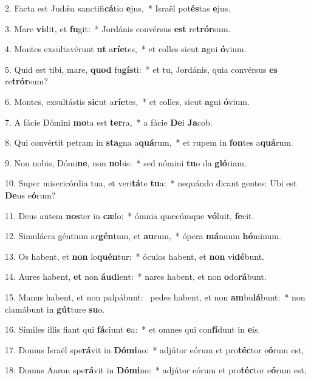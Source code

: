 2. Facta est Judǽa sanctifi\textbf{cá}tio \textbf{e}jus,~*  Israël pot\textbf{és}tas \textbf{e}jus.\

3. Mare \textbf{vi}dit, et \textbf{fu}git:~*  Jordánis convérsus \textbf{est} re\textbf{trór}sum.\

4. Montes exsultavérunt \textbf{ut} a\textbf{rí}\textbf{e}tes,~*  et colles sicut \textbf{a}gni \textbf{ó}vium.\

5. Quid est tibi, mare, \textbf{quod} fu\textbf{gís}ti:~*  et tu, Jordánis, quia convérsus \textbf{es} re\textbf{trór}sum?\

6. Montes, exsultástis \textbf{sic}ut a\textbf{rí}\textbf{e}tes,~*  et colles, sicut \textbf{a}gni \textbf{ó}vium.\

7. A fácie Dómini \textbf{mo}ta est \textbf{ter}ra,~*  a fácie \textbf{De}i \textbf{Ja}cob.\

8. Qui convértit petram in \textbf{sta}gna a\textbf{quá}rum,~*  et rupem in \textbf{fon}tes a\textbf{quá}rum.\

9. Non nobis, Dómi\textbf{ne}, non \textbf{no}bis:~*  sed nómini \textbf{tu}o da \textbf{gló}riam.\

10. Super misericórdia tua, et veri\textbf{tá}te \textbf{tu}a:~*  nequándo dicant gentes: Ubi est \textbf{De}us e\textbf{ó}rum?\

11. Deus autem \textbf{nos}ter in \textbf{cæ}lo:~*  ómnia quæcúmque \textbf{vó}luit, \textbf{fe}cit.\

12. Simulácra géntium ar\textbf{gén}tum, et \textbf{au}rum,~*  ópera \textbf{má}nuum \textbf{hó}minum.\

13. Os habent, et \textbf{non} lo\textbf{quén}tur:~*  óculos habent, et \textbf{non} vi\textbf{dé}bunt.\

14. Aures habent, \textbf{et} non \textbf{áu}\textbf{di}ent:~*  nares habent, et non \textbf{o}do\textbf{rá}bunt.\

15. Manus habent, et non palpábunt: \dag\  pedes habent, et non \textbf{am}bu\textbf{lá}bunt:~*  non clamábunt in \textbf{gút}ture \textbf{su}o.\

16. Símiles illis fiant qui \textbf{fá}ciunt \textbf{e}a:~*  et omnes qui con\textbf{fí}dunt in \textbf{e}is.\

17. Domus Israël spe\textbf{rá}vit in \textbf{Dó}\textbf{mi}no:~*  adjútor eórum et pro\textbf{téc}tor e\textbf{ó}rum est,\

18. Domus Aaron spe\textbf{rá}vit in \textbf{Dó}\textbf{mi}no:~*  adjútor eórum et pro\textbf{téc}tor e\textbf{ó}rum est,\

